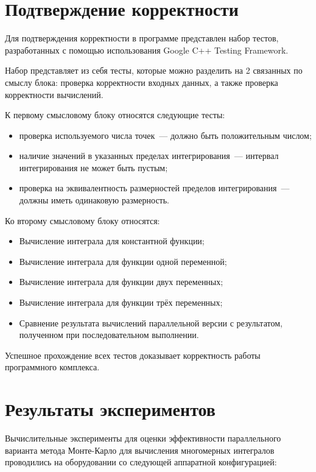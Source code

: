 \documentclass{report}
\begin{document}
\section*{Подтверждение корректности}
Для подтверждения корректности в программе представлен набор тестов, разработанных с помощью использования Google C++ Testing Framework.
\par Набор представляет из себя тесты, которые можно разделить на 2 связанных по смыслу блока: проверка корректности входных данных, а также проверка корректности вычислений.

\par К первому смысловому блоку относятся следующие тесты: 
\begin{itemize}
\item проверка используемого числа точек~--- должно быть положительным числом;
\item наличие значений в указанных пределах интегрирования~--- интервал интегрирования не может быть пустым;
\item проверка на эквивалентность размерностей пределов интегрирования~--- должны иметь одинаковую размерность.
\end{itemize}
 
\par Ко второму смысловому блоку относятся:
\begin{itemize}
\item Вычисление интеграла для константной функции;
\item Вычисление интеграла для функции одной переменной;
\item Вычисление интеграла для функции двух переменных;
\item Вычисление интеграла для функции трёх переменных;
\item Сравнение результата вычислений параллельной версии с результатом, полученном при последовательном выполнении.
\end{itemize}

\par Успешное прохождение всех тестов доказывает корректность работы программного комплекса.

\newpage


\section*{Результаты экспериментов}
Вычислительные эксперименты для оценки эффективности параллельного варианта метода Монте-Карло для вычисления многомерных интегралов проводились на оборудовании со следующей аппаратной конфигурацией:
\end{document}
